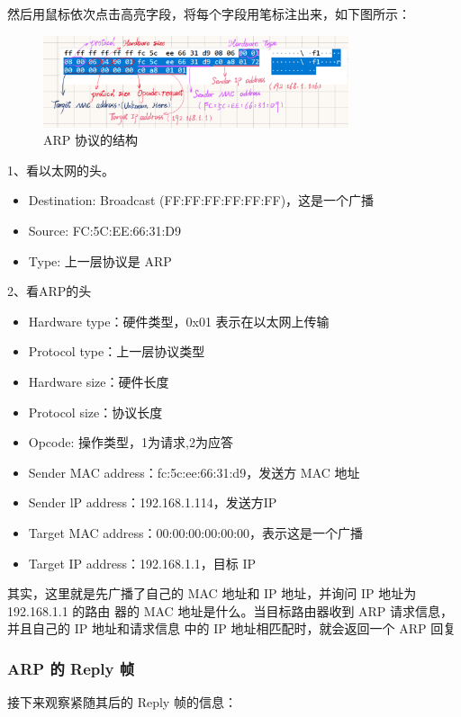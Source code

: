 \documentclass[14pt,a4paper,UTF8,twoside]{article}
\begin{document}
然后用鼠标依次点击高亮字段，将每个字段用笔标注出来，如下图所示：

\begin{figure}[H]
    \centering
    \includegraphics[width=0.8\textwidth]{lab4/draw.png}
    \caption{ARP 协议的结构}
\end{figure}

1、看以太网的头。
\begin{itemize}
    \item Destination: Broadcast (FF:FF:FF:FF:FF:FF)，这是一个广播
    \item Source: FC:5C:EE:66:31:D9
    \item Type: 上一层协议是 ARP
\end{itemize}

2、看ARP的头
\begin{itemize}
    \item Hardware type：硬件类型，0x01 表示在以太网上传输
    \item Protocol type：上一层协议类型
    \item Hardware size：硬件长度
    \item Protocol size：协议长度
    \item Opcode: 操作类型，1为请求,2为应答
    \item Sender MAC address：fc:5c:ee:66:31:d9，发送方 MAC 地址
    \item Sender lP address：192.168.1.114，发送方IP
    \item Target MAC address：00:00:00:00:00:00，表示这是一个广播
    \item Target IP address：192.168.1.1，目标 IP
\end{itemize}

其实，这里就是先广播了自己的 MAC 地址和 IP 地址，并询问 IP 地址为 192.168.1.1 的路由
器的 MAC 地址是什么。当目标路由器收到 ARP 请求信息，并且自己的 IP 地址和请求信息
中的 IP 地址相匹配时，就会返回一个 ARP 回复

\subsubsection{ARP 的 Reply 帧}

接下来观察紧随其后的 Reply 帧的信息：
\end{document}
